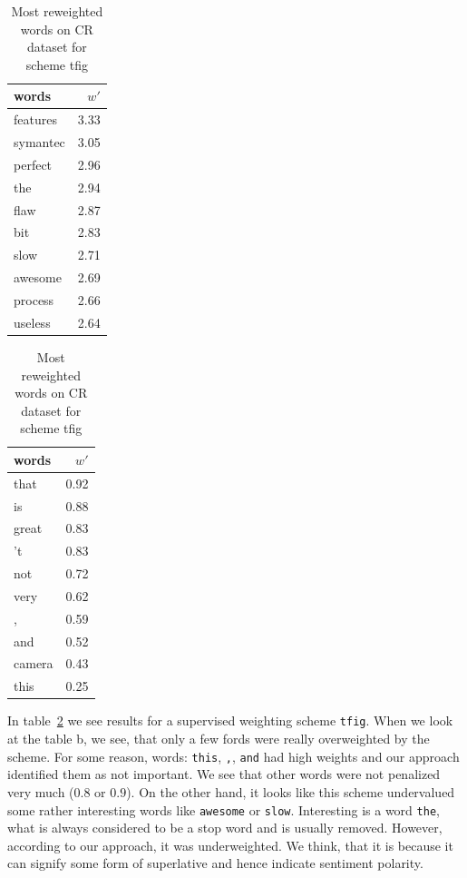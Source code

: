 \begin{table}[H]
    \centering
    \begin{minipage}{.4\linewidth}
      \centering
        \begin{tabular}{lr}
\toprule
    words &  $w'$ \\
\midrule
 features &  3.33 \\
 symantec &  3.05 \\
  perfect &  2.96 \\
      the &  2.94 \\
     flaw &  2.87 \\
      bit &  2.83 \\
     slow &  2.71 \\
  awesome &  2.69 \\
  process &  2.66 \\
  useless &  2.64 \\
\bottomrule
\end{tabular}

    \end{minipage}
    \begin{minipage}{.4\linewidth}
      \centering
        \begin{tabular}{lr}
\toprule
  words &  $w'$ \\
\midrule
   that &  0.92 \\
     is &  0.88 \\
  great &  0.83 \\
     't &  0.83 \\
    not &  0.72 \\
   very &  0.62 \\
      , &  0.59 \\
    and &  0.52 \\
 camera &  0.43 \\
   this &  0.25 \\
\bottomrule
\end{tabular}

    \end{minipage} 
    \caption{Most reweighted words on CR dataset for scheme tfig}
    \label{tab:words:CR:tfig}
\end{table}

    In table~\ref{tab:words:CR:tfig} we see results for a supervised weighting scheme \texttt{tfig}.
    When we look at the table b, we see, that only a few fords were really overweighted by the scheme. 
    For some reason, words: \texttt{this}, \texttt{,}, \texttt{and} had high weights and our approach identified them as not important.
    We see that other words were not penalized very much ($0.8$ or $0.9$).
    On the other hand, it looks like this scheme undervalued some rather interesting words like \texttt{awesome} or \texttt{slow}.
    Interesting is a word \texttt{the}, what is always considered to be a stop word and is usually removed. 
    However, according to our approach, it was underweighted. 
    We think, that it is because it can signify some form of superlative and hence indicate sentiment polarity.
    

